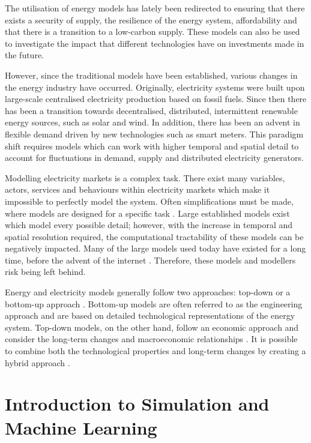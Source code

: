 The utilisation of energy models has lately been redirected to ensuring that there exists a security of supply, the resilience of the energy system, affordability and that there is a transition to a low-carbon supply. These models can also be used to investigate the impact that different technologies have on investments made in the future. 

However, since the traditional models have been established, various changes in the energy industry have occurred. Originally, electricity systems were built upon large-scale centralised electricity production based on fossil fuels. Since then there has been a transition towards decentralised, distributed, intermittent renewable energy sources, such as solar and wind. In addition, there has been an advent in flexible demand driven by new technologies such as smart meters. This paradigm shift requires models which can work with higher temporal and spatial detail to account for fluctuations in demand, supply and distributed electricity generators.

Modelling electricity markets is a complex task. There exist many variables, actors, services and behaviours within electricity markets which make it impossible to perfectly model the system. Often simplifications must be made, where models are designed for a specific task \cite{Pfenninger2014b}. Large established models exist which model every possible detail; however, with the increase in temporal and spatial resolution required, the computational tractability of these models can be negatively impacted. Many of the large models used today have existed for a long time, before the advent of the internet \cite{Pfenninger2014b}. Therefore, these models and modellers risk being left behind.

Energy and electricity models generally follow two approaches: top-down or a bottom-up approach \cite{Ringkjob2018}. Bottom-up models are often referred to as the engineering approach and are based on detailed technological representations of the energy system. Top-down models, on the other hand, follow an economic approach and consider the long-term changes and macroeconomic relationships \cite{Mai2013}. It is possible to combine both the technological properties and long-term changes by creating a hybrid approach \cite{Fortes2014}.




\section{Introduction to Simulation and Machine Learning}
\label{sec:intro:simulationmodelling}

